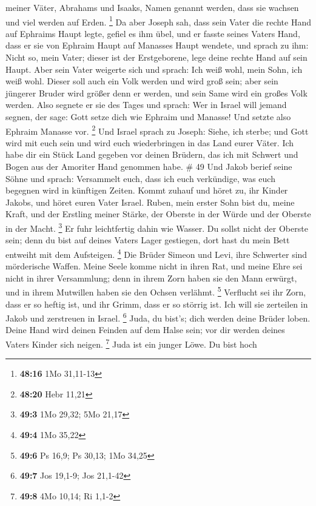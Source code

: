 meiner Väter, Abrahams und Isaaks, Namen genannt werden, dass sie
wachsen und viel werden auf Erden. \footnote{\textbf{48:16} 1Mo 31,11-13}
 Da aber Joseph sah, dass sein Vater die rechte Hand auf
Ephraims Haupt legte, gefiel es ihm übel, und er fasste seines Vaters
Hand, dass er sie von Ephraim Haupt auf Manasses Haupt wendete,
 und sprach zu ihm: Nicht so, mein Vater; dieser ist der
Erstgeborene, lege deine rechte Hand auf sein Haupt. 
Aber sein Vater weigerte sich und sprach: Ich weiß wohl, mein Sohn, ich
weiß wohl. Dieser soll auch ein Volk werden und wird groß sein; aber
sein jüngerer Bruder wird größer denn er werden, und sein Same wird ein
großes Volk werden.  Also segnete er sie des Tages und
sprach: Wer in Israel will jemand segnen, der sage: Gott setze dich wie
Ephraim und Manasse! Und setzte also Ephraim Manasse vor. \footnote{\textbf{48:20}
  Hebr 11,21}  Und Israel sprach zu Joseph: Siehe, ich
sterbe; und Gott wird mit euch sein und wird euch wiederbringen in das
Land eurer Väter.  Ich habe dir ein Stück Land gegeben
vor deinen Brüdern, das ich mit Schwert und Bogen aus der Amoriter Hand
genommen habe. \# 49  Und Jakob berief seine Söhne und
sprach: Versammelt euch, dass ich euch verkündige, was euch begegnen
wird in künftigen Zeiten.  Kommt zuhauf und höret zu, ihr
Kinder Jakobs, und höret euren Vater Israel.  Ruben, mein
erster Sohn bist du, meine Kraft, und der Erstling meiner Stärke, der
Oberste in der Würde und der Oberste in der Macht. \footnote{\textbf{49:3}
  1Mo 29,32; 5Mo 21,17}  Er fuhr leichtfertig dahin wie
Wasser. Du sollst nicht der Oberste sein; denn du bist auf deines Vaters
Lager gestiegen, dort hast du mein Bett entweiht mit dem Aufsteigen.
\footnote{\textbf{49:4} 1Mo 35,22}  Die Brüder Simeon und
Levi, ihre Schwerter sind mörderische Waffen.  Meine Seele
komme nicht in ihren Rat, und meine Ehre sei nicht in ihrer Versammlung;
denn in ihrem Zorn haben sie den Mann erwürgt, und in ihrem Mutwillen
haben sie den Ochsen verlähmt. \footnote{\textbf{49:6} Ps 16,9; Ps
  30,13; 1Mo 34,25}  Verflucht sei ihr Zorn, dass er so
heftig ist, und ihr Grimm, dass er so störrig ist. Ich will sie
zerteilen in Jakob und zerstreuen in Israel. \footnote{\textbf{49:7} Jos
  19,1-9; Jos 21,1-42}  Juda, du bist's; dich werden deine
Brüder loben. Deine Hand wird deinen Feinden auf dem Halse sein; vor dir
werden deines Vaters Kinder sich neigen. \footnote{\textbf{49:8} 4Mo
  10,14; Ri 1,1-2}  Juda ist ein junger Löwe. Du bist hoch
